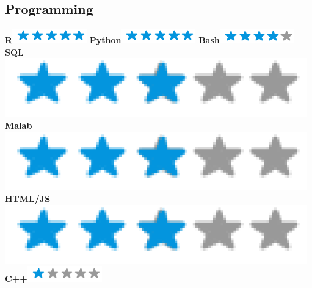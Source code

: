 \documentclass[]{friggeri-cv}
\begin{document}
\begin{aside}
  \section{Programming}
    \textbf{R}\includegraphics[scale=0.40]{img/5stars.png}
    \textbf{Python}\includegraphics[scale=0.40]{img/5stars.png}
    \textbf{Bash}\includegraphics[scale=0.40]{img/4stars.png}
    \textbf{SQL}\includegraphics[scale=0.40]{img/3stars.png}
    \textbf{Malab}\includegraphics[scale=0.40]{img/3stars.png}
    \textbf{HTML/JS}\includegraphics[scale=0.40]{img/3stars.png}
    \textbf{C++}\includegraphics[scale=0.40]{img/1stars.png}
    ~

\end{aside}
\end{document}
